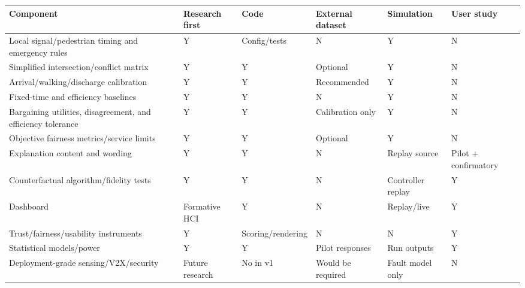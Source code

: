 \documentclass[
  english,
  11pt,
  a4paper,
]{article}
\newcounter{none} %
\begin{document}
{\def\LTcaptype{none} %
\begin{longtable}[]{@{}
  >{\raggedright\arraybackslash}p{}
  >{\centering\arraybackslash}p{}
  >{\centering\arraybackslash}p{}
  >{\centering\arraybackslash}p{}
  >{\centering\arraybackslash}p{}
  >{\centering\arraybackslash}p{}@{}}
\toprule\noalign{}
\begin{minipage}[b]{\linewidth}\raggedright
Component
\end{minipage} & \begin{minipage}[b]{\linewidth}\centering
Research first
\end{minipage} & \begin{minipage}[b]{\linewidth}\centering
Code
\end{minipage} & \begin{minipage}[b]{\linewidth}\centering
External dataset
\end{minipage} & \begin{minipage}[b]{\linewidth}\centering
Simulation
\end{minipage} & \begin{minipage}[b]{\linewidth}\centering
User study
\end{minipage} \\
\midrule\noalign{}
\endhead
\bottomrule\noalign{}
\endlastfoot
Local signal/\allowbreak pedestrian timing and emergency rules & Y &
Config/\allowbreak tests &
N & Y & N \\
Simplified intersection/conflict matrix & Y & Y & Optional & Y & N \\
Arrival/walking/discharge calibration & Y & Y & Recommended & Y & N \\
Fixed-time and efficiency baselines & Y & Y & N & Y & N \\
Bargaining utilities, disagreement, and efficiency tolerance & Y & Y &
Calibration only & Y & N \\
Objective fairness metrics/service limits & Y & Y & Optional & Y & N \\
Explanation content and wording & Y & Y & N & Replay source & Pilot +
confirmatory \\
Counterfactual algorithm/fidelity tests & Y & Y & N & Controller replay
& Y \\
Dashboard & Formative HCI & Y & N & Replay/live & Y \\
Trust/\allowbreak fairness/\allowbreak usability instruments & Y &
Scoring/\allowbreak rendering & N & N &
Y \\
Statistical models/power & Y & Y & Pilot responses & Run outputs & Y \\
Deployment-grade sensing/V2X/security & Future research & No in v1 &
Would be required & Fault model only & N \\
\end{longtable}
}
\end{document}
